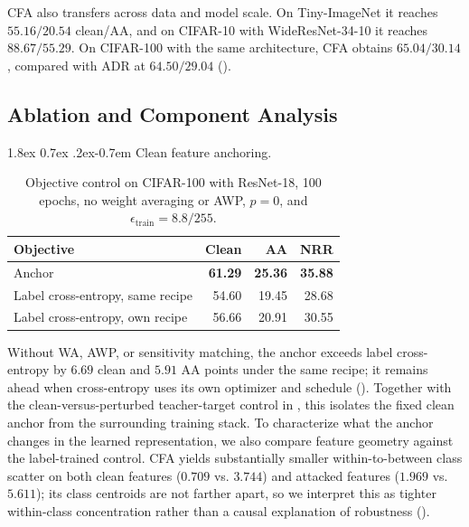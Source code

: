 \documentclass{article} %
\makeatletter
\theoremstyle{plain}
\renewcommand{\paragraph}{\@startsection{paragraph}{4}{\z@}%
  {1.8ex \@plus 0.7ex \@minus .2ex}{-0.7em}%
  {\normalfont\normalsize\bfseries}}
\makeatother
\begin{document}
CFA also transfers across data and model scale. On Tiny-ImageNet it reaches
\(55.16/20.54\) clean/AA, and on CIFAR-10 with WideResNet-34-10 it reaches
\(88.67/55.29\). On CIFAR-100 with the same architecture, CFA obtains
\(65.04/30.14\), compared with ADR at \(64.50/29.04\)
().

\subsection{Ablation and Component Analysis}
\label{sec:components}
\paragraph{Clean feature anchoring.}
\begin{table}[!htbp]
  \centering
  \small
  \setlength{\tabcolsep}{5pt}
  \caption{
  Objective control on CIFAR-100 with ResNet-18, 100 epochs, no weight
  averaging or AWP, \(p=0\), and
  \(\epsilon_{\mathrm{train}}=8.8/255\).
  }
  \label{tab:controls}
  \begin{tabular}{lrrr}
    \toprule
    Objective & Clean & AA & NRR \\
    \midrule
    Anchor
      & \textbf{61.29} & \textbf{25.36} & \textbf{35.88} \\
    Label cross-entropy, same recipe
      & 54.60 & 19.45 & 28.68 \\
    Label cross-entropy, own recipe
      & 56.66 & 20.91 & 30.55 \\
    \bottomrule
  \end{tabular}
\end{table}

Without WA, AWP, or sensitivity matching, the anchor exceeds label
cross-entropy by \(6.69\) clean and \(5.91\) AA points under the same recipe;
it remains ahead when cross-entropy uses its own optimizer and schedule
(). Together with the clean-versus-perturbed teacher-target
control in , this isolates the fixed clean anchor from the
surrounding training stack. To characterize what the anchor changes in the
learned representation, we also compare feature geometry against the
label-trained control. CFA yields substantially smaller within-to-between
class scatter on both clean features (\(0.709\) vs. \(3.744\)) and attacked
features (\(1.969\) vs. \(5.611\)); its class centroids are not farther apart,
so we interpret this as tighter within-class concentration rather than a
causal explanation of robustness ().
\end{document}
